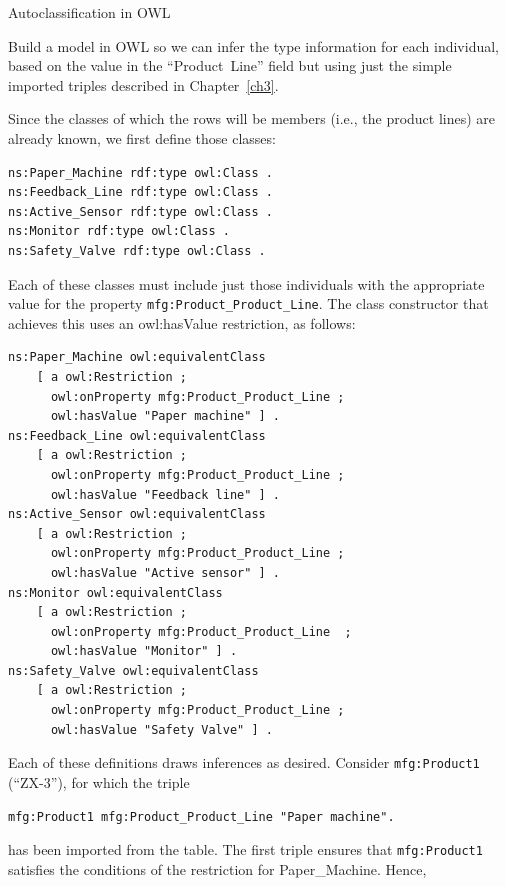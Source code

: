\begin{challenge}{Autoclassification in OWL}

Build a model in OWL so we can infer the type information for each
individual, based on the value in the ``Product\ Line'' 
field but using just the simple imported triples described in
Chapter~\ref{ch3}.

\solution

Since the classes of which the rows will be members (i.e., the product
lines) are already known, we first define those classes:

\begin{lstlisting}
ns:Paper_Machine rdf:type owl:Class .
ns:Feedback_Line rdf:type owl:Class .
ns:Active_Sensor rdf:type owl:Class .
ns:Monitor rdf:type owl:Class .
ns:Safety_Valve rdf:type owl:Class .
\end{lstlisting}

Each of these classes must include just those individuals with the
appropriate value for the property \texttt{mfg:Product\_Product\_Line}. The class
constructor that achieves this uses an owl:hasValue restriction, as
follows:

\begin{lstlisting}
ns:Paper_Machine owl:equivalentClass
    [ a owl:Restriction ;
      owl:onProperty mfg:Product_Product_Line ;
      owl:hasValue "Paper machine" ] .
ns:Feedback_Line owl:equivalentClass
    [ a owl:Restriction ;
      owl:onProperty mfg:Product_Product_Line ;
      owl:hasValue "Feedback line" ] .
ns:Active_Sensor owl:equivalentClass
    [ a owl:Restriction ;
      owl:onProperty mfg:Product_Product_Line ;
      owl:hasValue "Active sensor" ] .
ns:Monitor owl:equivalentClass
    [ a owl:Restriction ;
      owl:onProperty mfg:Product_Product_Line  ;
      owl:hasValue "Monitor" ] .
ns:Safety_Valve owl:equivalentClass
    [ a owl:Restriction ;
      owl:onProperty mfg:Product_Product_Line ;
      owl:hasValue "Safety Valve" ] .
\end{lstlisting}

Each of these definitions draws inferences as desired. Consider
\texttt{mfg:Product1} (``ZX-3''), for which the triple

\begin{lstlisting}
mfg:Product1 mfg:Product_Product_Line "Paper machine".
\end{lstlisting}

has been imported from the table. The first triple ensures that
\texttt{mfg:Product1} satisfies the conditions of the restriction for
Paper\_Machine. Hence,


\end{challenge}
